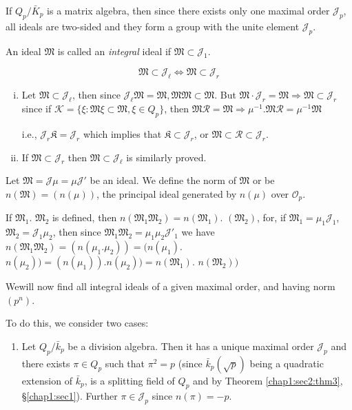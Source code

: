 If $Q_p /\bar{K}_p$ is a matrix algebra, then since there exists
only one maximal order $\mathcal{J}_p$, all ideals are two-sided and
they form a group with the unite element $\mathcal{J}_p$. 
\begin{defi*}
  An ideal $\mathfrak{M}$ is called an {\em integral} ideal if
  $\mathfrak{M} \subset \mathcal{J}_1$. 
\end{defi*}
$$
\mathfrak{M} \subset \mathcal{J}_\ell \Leftrightarrow \mathfrak{M}
\subset \mathcal{J}_r 
$$
\begin{enumerate}[(i)]
\item Let $\mathfrak{M} \subset \mathcal{J}_\ell$, then since
  $\mathcal{J}_\ell \mathfrak{M} = \mathfrak{M},  \mathfrak{M}
  \mathfrak{M} \subset \mathfrak{M}$. But $\mathfrak{M}\cdot
  \mathcal{J}_r = \mathfrak{M} 
  \Rightarrow \mathfrak{M} \subset \mathcal{J}_r$ since if $\mathscr{K}
  = \{\xi:\mathfrak{M} \xi \subset \mathfrak{M}, \xi \in Q_p\}$,
  then $\mathfrak{M} \mathscr{R} = \mathfrak{M} \Rightarrow
  \mu^{-1}. \mathfrak{M} \mathscr{R} = \mu^{-1} \mathfrak{M}$ 
  
  i.e., \quad $\mathcal{J}_r \mathfrak{K} = \mathcal{J}_r$ which implies that
  $\mathfrak{K} \subset \mathcal{J}_r$, or $\mathfrak{M} \subset
  \mathscr{R} \subset \mathcal{J}_r$. 
\item If $\mathfrak{M} \subset \mathcal{J}_r $ then $\mathfrak{M}
  \subset \mathcal{J}_\ell$ is similarly proved. 
\end{enumerate}

\begin{defi*}
  Let $\mathfrak{M} = \mathcal{J} \mu = \mu \mathcal{J}'$ be an
  ideal. We define the norm of $\mathfrak{M}$ or be $n(\mathfrak{M}) =
  (n(\mu))$, the principal ideal generated by $n(\mu)$ over $\mathscr{O}_p$. 
\end{defi*}

If $\mathfrak{M}_1$.  $\mathfrak{M}_2$ is defined, then $n
(\mathfrak{M}_1 \mathfrak{M}_2) = n (\mathfrak{M}_1)$. $
(\mathfrak{M}_2)$, for, if $\mathfrak{M}_1 = \mu_1 \mathcal{J}_1$,
$\mathfrak{M}_2 = \mathcal{J}_1 \mu_2$, then since $\mathfrak{M}_1
\mathfrak{M}_2 = \mu_1 \mu_2 \mathcal{J}'_1$ we have $n(\mathfrak{M}_1
\mathfrak{M}_2) = (n(\mu_1.\mu_2)) = (n(\mu_1)$. $n(\mu_2)) =
(n(\mu_1)). n(\mu_2)) = n(\mathfrak{M}_1)$. $n(\mathfrak{M}_2))$ 

We\pageoriginale will now find all integral ideals of a given maximal order, and
having norm $(p^n)$. 

To do this, we consider two cases:
\begin{enumerate}[(1)]
\item  Let $Q_p /\bar{k}_p$ be a division algebra. Then it has a
  unique maximal order $\mathcal{J}_p$ and there exists $\pi \in Q_p$
  such that $\pi^2 = p$ (since $\bar{k}_p (\sqrt{p})$ being a
  quadratic extension of $\bar{k}_p$, is a splitting field of $Q_p$
  and by Theorem \ref{chap1:sec2:thm3}, \S \ref{chap1:sec1}). Further $\pi \in \mathcal{J}_p$ since
  $n(\pi) = -p$. 
\end{enumerate}

